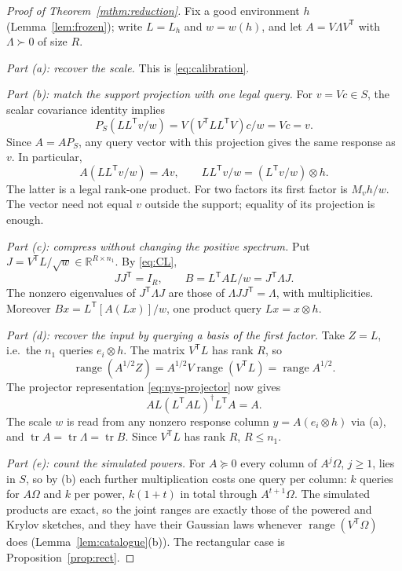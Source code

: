\documentclass[11pt,a4paper]{article}
\theoremstyle{definition}
\theoremstyle{remark}
\numberwithin{equation}{section}
\newcommand{\R}{\mathbb R}
\newcommand{\T}{{\mathsf T}}
\newcommand{\tr}{\operatorname{tr}}
\newcommand{\range}{\operatorname{range}}
\begin{document}
\begin{proof}[Proof of Theorem~\ref{mthm:reduction}]
Fix a good environment $h$ (Lemma~\ref{lem:frozen}); write $L=L_h$ and
$w=w(h)$, and let $A=V\Lambda V^\T$ with $\Lambda\succ0$ of size $R$.

\emph{Part (a): recover the scale.} This is \eqref{eq:calibration}.

\emph{Part (b): match the support projection with one legal query.}
For $v=Vc\in S$, the scalar covariance identity implies
\[
 P_S(LL^\T v/w)=V(V^\T LL^\T V)c/w=Vc=v.
\]
Since $A=AP_S$, any query vector with this projection gives the same response
as $v$. In particular,
\[
 A(LL^\T v/w)=Av,
 \qquad LL^\T v/w=(L^\T v/w)\otimes h.
\]
The latter is a legal rank-one product. For two factors its first factor is
$M_vh/w$. The vector need not equal $v$ outside the support; equality of its
projection is enough.

\emph{Part (c): compress without changing the positive spectrum.}
Put $J=V^\T L/\sqrt w\in\R^{R\times n_1}$. By \eqref{eq:CL},
\[
 JJ^\T=I_R,
 \qquad B=L^\T AL/w=J^\T\Lambda J.
\]
The nonzero eigenvalues of $J^\T\Lambda J$ are those
of $\Lambda JJ^\T=\Lambda$, with multiplicities. Moreover $Bx=L^\T[A(Lx)]/w$,
one product query $Lx=x\otimes h$.

\emph{Part (d): recover the input by querying a basis of the first factor.}
Take $Z=L$, i.e.\ the $n_1$ queries $e_i\otimes h$. The matrix $V^\T L$ has
rank $R$, so
\[
 \range(A^{1/2}Z)
 =A^{1/2}V\range(V^\T L)
 =\range A^{1/2}.
\]
The projector representation \eqref{eq:nys-projector} now gives
\[
 AL(L^\T AL)^\dagger L^\T A=A.
\]
The scale $w$ is read from any nonzero
response column $y=A(e_i\otimes h)$ via (a), and $\tr A=\tr\Lambda=\tr B$.
Since $V^\T L$ has rank $R$, $R\le n_1$.

\emph{Part (e): count the simulated powers.}
For $A\succeq0$ every column of $A^j\Omega$, $j\ge1$, lies in $S$, so by (b)
each further multiplication costs one query per column: $k$ queries for
$A\Omega$ and $k$ per power, $k(1+t)$ in total through $A^{t+1}\Omega$. The
simulated products are exact, so the joint ranges are exactly those of the
powered and Krylov sketches, and they have their Gaussian laws whenever
$\range(V^\T\Omega)$ does (Lemma~\ref{lem:catalogue}(b)). The rectangular case
is Proposition~\ref{prop:rect}.
\end{proof}
\end{document}
